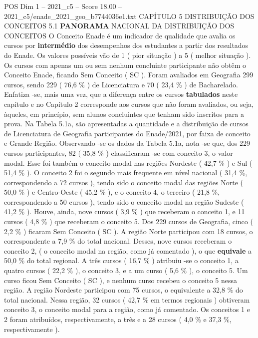 \begin{textsample}{POS Dim 1 – 2021\_c5 – Score 18.00 – 2021\_c5/enade\_2021\_geo\_b7744036e1.txt}  \label{ex:f1_pos_038}
CAPÍTULO 5 DISTRIBUIÇÃO DOS CONCEITOS 5.1 \textbf{PANORAMA} NACIONAL DA DISTRIBUIÇÃO DOS CONCEITOS O Conceito Enade é um indicador de qualidade que avalia os cursos por \textbf{intermédio} dos desempenhos dos estudantes a partir dos resultados do Enade.
Os valores possíveis vão de 1 ( pior situação ) a 5 ( melhor situação ).
Os cursos com apenas um ou sem nenhum concluinte participante não obtêm o Conceito Enade, ficando Sem Conceito ( SC ).
Foram avaliados em Geografia 299 cursos, sendo 229 ( 76,6 \% ) de Licenciatura e 70 ( 23,4 \% ) de Bacharelado.
Enfatiza -se, mais uma vez, que a diferença entre os cursos \textbf{tabulados} neste capítulo e no Capítulo 2 corresponde aos cursos que não foram avaliados, ou seja, àqueles, em princípio, sem alunos concluintes que tenham sido inscritos para a prova.
Na Tabela 5.1a, são apresentadas a quantidade e a distribuição de cursos de Licenciatura de Geografia participantes do Enade/2021, por faixa de conceito e Grande Região.
Observando -se os dados da Tabela 5.1a, nota -se que, dos 229 cursos participantes, 82 ( 35,8 \% ) classificaram -se com conceito 3, o valor modal.
Esse foi também o conceito modal nas regiões Nordeste ( 42,7 \% ) e Sul ( 51,4 \% ).
O conceito 2 foi o segundo mais frequente em nível nacional ( 31,4 \%, correspondendo a 72 cursos ), tendo sido o conceito modal das regiões Norte ( 50,0 \% ) e Centro-Oeste ( 45,2 \% ), e o conceito 4, o terceiro ( 21,8 \%, correspondendo a 50 cursos ), tendo sido o conceito modal na região Sudeste ( 41,2 \% ).
Houve, ainda, nove cursos ( 3,9 \% ) que receberam o conceito 1, e 11 cursos ( 4,8 \% ) que receberam o conceito 5.
Dos 229 cursos de Geografia, cinco ( 2,2 \% ) ficaram Sem Conceito ( SC ).
A região Norte participou com 18 cursos, o correspondente a 7,9 \% do total nacional.
Desses, nove cursos receberam o conceito 2, ( o conceito modal na região, como já comentado ), o que \textbf{equivale} a 50,0 \% do total regional.
A três cursos ( 16,7 \% ) atribuiu -se o conceito 1, a quatro cursos ( 22,2 \% ), o conceito 3, e a um curso ( 5,6 \% ), o conceito 5.
Um curso ficou Sem Conceito ( SC ), e nenhum curso recebeu o conceito 5 nessa região.
A região Nordeste participou com 75 cursos, o equivalente a 32,8 \% do total nacional.
Nessa região, 32 cursos ( 42,7 \% em termos regionais ) obtiveram conceito 3, o conceito modal para a região, como já comentado.
Os conceitos 1 e 2 foram atribuídos, respectivamente, a três e a 28 cursos ( 4,0 \% e 37,3 \%, respectivamente ).

\end{textsample}
